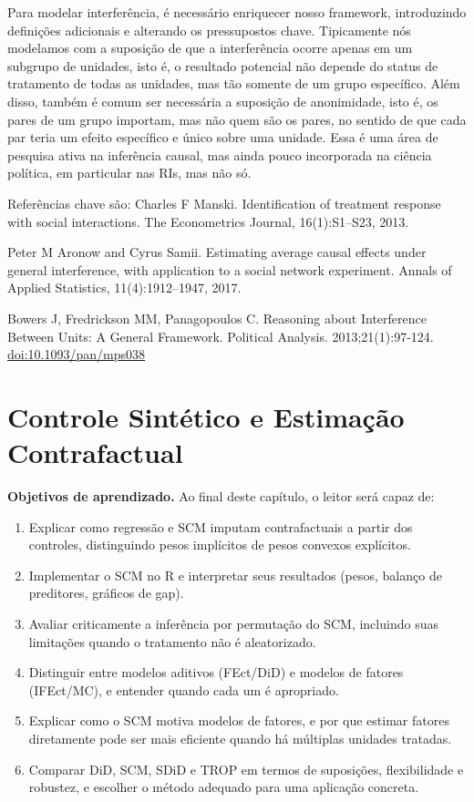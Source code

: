 \documentclass[
]{article}
\providecommand{\tightlist}{%
  \setlength{\itemsep}{0pt}\setlength{\parskip}{0pt}}
\begin{document}
Para modelar interferência, é necessário enriquecer nosso framework, introduzindo definições adicionais e alterando os pressupostos chave. Tipicamente nós modelamos com a suposição de que a interferência ocorre apenas em um subgrupo de unidades, isto é, o resultado potencial não depende do status de tratamento de todas as unidades, mas tão somente de um grupo específico. Além disso, também é comum ser necessária a suposição de anonimidade, isto é, os pares de um grupo importam, mas não quem são os pares, no sentido de que cada par teria um efeito específico e único sobre uma unidade. Essa é uma área de pesquisa ativa na inferência causal, mas ainda pouco incorporada na ciência política, em particular nas RIs, mas não só.

Referências chave são:
Charles F Manski. Identification of treatment response with social interactions. The Econometrics Journal, 16(1):S1--S23, 2013.

Peter M Aronow and Cyrus Samii. Estimating average causal effects under general interference, with application to a social network experiment. Annals of Applied Statistics, 11(4):1912--1947, 2017.

Bowers J, Fredrickson MM, Panagopoulos C. Reasoning about Interference Between Units: A General Framework. Political Analysis. 2013;21(1):97-124. \url{doi:10.1093/pan/mps038}

\section{Controle Sintético e Estimação Contrafactual}\label{controle-sintuxe9tico-e-estimauxe7uxe3o-contrafactual}

\textbf{Objetivos de aprendizado.} Ao final deste capítulo, o leitor será capaz de:

\begin{enumerate}
\def\labelenumi{\arabic{enumi}.}
\tightlist
\item
  Explicar como regressão e SCM imputam contrafactuais a partir dos controles, distinguindo pesos implícitos de pesos convexos explícitos.
\item
  Implementar o SCM no R e interpretar seus resultados (pesos, balanço de preditores, gráficos de gap).
\item
  Avaliar criticamente a inferência por permutação do SCM, incluindo suas limitações quando o tratamento não é aleatorizado.
\item
  Distinguir entre modelos aditivos (FEct/DiD) e modelos de fatores (IFEct/MC), e entender quando cada um é apropriado.
\item
  Explicar como o SCM motiva modelos de fatores, e por que estimar fatores diretamente pode ser mais eficiente quando há múltiplas unidades tratadas.
\item
  Comparar DiD, SCM, SDiD e TROP em termos de suposições, flexibilidade e robustez, e escolher o método adequado para uma aplicação concreta.
\end{enumerate}
\end{document}
